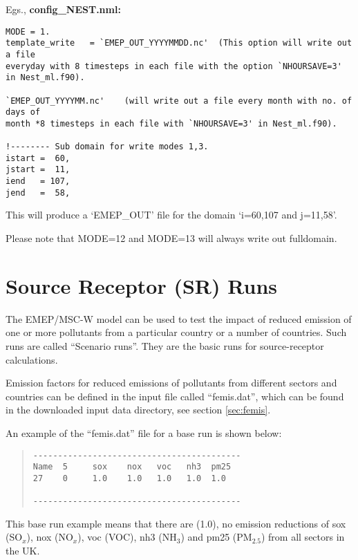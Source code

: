 Egs.,  \bf {config\_NEST.nml:}

\begin{verbatim}
MODE = 1.
template_write   = `EMEP_OUT_YYYYMMDD.nc'  (This option will write out a file 
everyday with 8 timesteps in each file with the option `NHOURSAVE=3' in Nest_ml.f90).  

`EMEP_OUT_YYYYMM.nc'    (will write out a file every month with no. of days of 
month *8 timesteps in each file with `NHOURSAVE=3' in Nest_ml.f90).
				
!-------- Sub domain for write modes 1,3. 
istart =  60,   
jstart =  11,   
iend   = 107,   
jend   =  58,   
\end{verbatim}

This will produce a `EMEP\_OUT' file for the domain `i=60,107 and j=11,58'.  

Please note that MODE=12 and MODE=13 will always write out fulldomain.   




\section {Source Receptor (SR) Runs}

The EMEP/MSC-W model can be used to test the impact of reduced emission of
one or more pollutants from a particular country or a number of
countries.  Such runs are called ``Scenario runs''. They are the basic
runs for source-receptor calculations.

Emission factors for reduced emissions of pollutants from different
sectors and countries can be defined in the input file called
``femis.dat'', which can be found in the downloaded input data
directory, see section \ref{sec:femis}.

An example of the ``femis.dat'' file for a base run is shown below:
\begin{quote}

\begin{verbatim}
------------------------------------------
Name  5     sox    nox   voc   nh3  pm25
27    0     1.0    1.0   1.0   1.0  1.0  

------------------------------------------
\end{verbatim}
\end{quote}
\noindent
This base run example means that there are (1.0), no emission reductions of 
sox (SO$_x$), nox (NO$_x$), voc (VOC), nh3 (NH$_3$) and pm25 (PM$_{2.5}$) from 
all sectors in the UK. 

